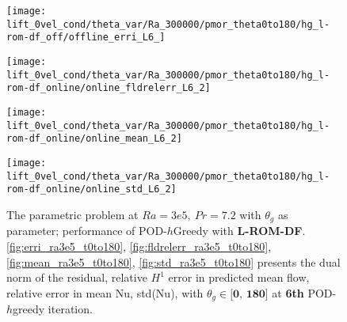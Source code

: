 \begin{figure}[h!]
    \begin{minipage}[b]{.25\linewidth}
        \centering \texttt{[image: lift\_0vel\_cond/theta\_var/Ra\_300000/pmor\_theta0to180/hg\_l-rom-df\_off/offline\_erri\_L6\_]}
        \label{fig:erri_ra3e5_t0to180}
    \end{minipage}%
    \begin{minipage}[b]{.25\linewidth}
        \centering \texttt{[image: lift\_0vel\_cond/theta\_var/Ra\_300000/pmor\_theta0to180/hg\_l-rom-df\_online/online\_fldrelerr\_L6\_2]}
        \label{fig:fldrelerr_ra3e5_t0to180}
    \end{minipage}
    \begin{minipage}[b]{.25\linewidth}
        \centering \texttt{[image: lift\_0vel\_cond/theta\_var/Ra\_300000/pmor\_theta0to180/hg\_l-rom-df\_online/online\_mean\_L6\_2]}
        \label{fig:mean_ra3e5_t0to180}
    \end{minipage}%
    \begin{minipage}[b]{.25\linewidth}
        \centering \texttt{[image: lift\_0vel\_cond/theta\_var/Ra\_300000/pmor\_theta0to180/hg\_l-rom-df\_online/online\_std\_L6\_2]}
        \label{fig:std_ra3e5_t0to180}
    \end{minipage} 
    \caption{The parametric problem at $Ra=3e5,~Pr=7.2$ with $\theta_g$ as
    parameter; performance of POD-$h$Greedy with \textbf{L-ROM-DF}.  \ref{fig:erri_ra3e5_t0to180},
    \ref{fig:fldrelerr_ra3e5_t0to180}, \ref{fig:mean_ra3e5_t0to180}, \ref{fig:std_ra3e5_t0to180}
    presents the dual norm of the residual, relative $H^1$ error in predicted
    mean flow, relative error in mean Nu, std(Nu), with $\theta_g \in
    \textbf{[0,~180]}$ at \textbf{6th} POD-$h$greedy iteration.}
    \label{fig:online_ra3e5_t0to180} 
\end{figure}
